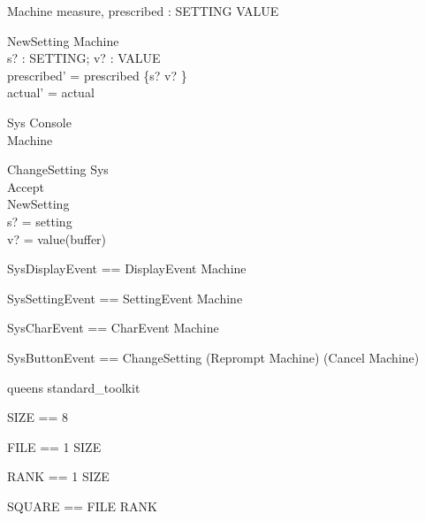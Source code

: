 \documentclass{llncs}
\begin{document}
\begin{schema}{Machine}
measure, prescribed : SETTING \fun VALUE
\end{schema}
\begin{schema}{NewSetting}
\Delta Machine \\
s? : SETTING; v? : VALUE \\
\where prescribed' = prescribed \oplus \{s? \mapsto v? \}\\
actual' = actual
\end{schema}
\begin{schema}{Sys}
Console \\
Machine
\end{schema}
\begin{schema}{ChangeSetting}
\Delta Sys \\
Accept \\
NewSetting \\
\where s? = setting \\
v? = value(buffer)
\end{schema}
\begin{zed}
SysDisplayEvent == DisplayEvent \land \Xi Machine
\end{zed}
\begin{zed}
SysSettingEvent == SettingEvent \land \Xi Machine
\end{zed}
\begin{zed}
SysCharEvent == CharEvent \land \Xi Machine
\end{zed}
\begin{zed}
SysButtonEvent == ChangeSetting \lor (Reprompt \land \Xi
Machine) \lor (Cancel \land \Xi Machine)
\end{zed}



\begin{zsection}
\SECTION queens \parents standard\_toolkit
\end{zsection}

\begin{zed}
SIZE == 8
\end{zed}

\begin{zed}
FILE == 1 \upto SIZE
\end{zed}

\begin{zed}
RANK == 1 \upto SIZE
\end{zed}

\begin{zed}
SQUARE == FILE \cross RANK
\end{zed}
\end{document}
